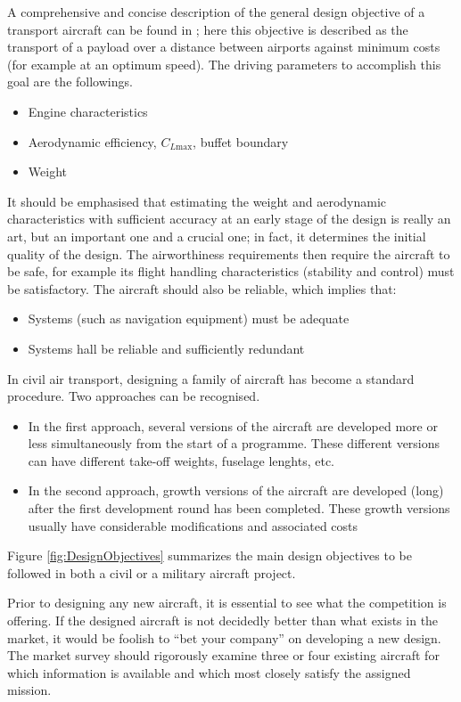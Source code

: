 \bigskip
\noindent
A comprehensive and concise description of the general design objective of a transport aircraft can be found in \cite{obert2009aerodynamic}; here this objective is described as the transport of a payload over a distance between airports against minimum costs (for example at an optimum speed).
The driving parameters to accomplish this goal are the followings.
%
\begin{itemize}
\item Engine characteristics
\item Aerodynamic efficiency, $C_{L\text{max}}$, buffet boundary
\item Weight
\end{itemize}
%
It should be emphasised that estimating the weight and aerodynamic characteristics with sufficient accuracy at an early stage of the design is really an art, but an important one and a crucial one; in fact, it determines the initial quality of the design.
%
The airworthiness requirements then require the aircraft to be safe, for example its flight handling characteristics (stability and control) must be satisfactory. The aircraft should also be reliable, which implies that:
%
\begin{itemize}
\item Systems (such as navigation equipment) must be adequate
\item Systems hall be reliable and sufficiently redundant
\end{itemize}
%
In civil air transport, designing a family of aircraft has become a standard procedure. Two approaches can be recognised.
%
\begin{itemize}
\item In the first approach, several versions of the aircraft are developed more or less simultaneously from the start of a programme. These different versions can have different take-off weights, fuselage lenghts, etc.
\item In the second approach, growth versions of the aircraft are developed (long) after the first development round has been completed. These growth versions usually have considerable modifications and associated costs
\end{itemize}
%
Figure \ref{fig:DesignObjectives} summarizes the main design objectives to be followed in both a civil or a military aircraft project.

\bigskip
\noindent
Prior to designing any new aircraft, it is essential to see what the competition is offering. If the designed aircraft is not decidedly better than what exists in the market, it would be foolish to “bet your company” on developing a new design. The market survey should rigorously examine three or four existing aircraft for
which information is available and which most closely satisfy the assigned mission.\cite{sforza2014commercial}

